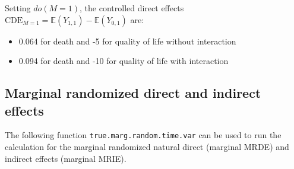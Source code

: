 \documentclass[
]{book}
\providecommand{\tightlist}{%
  \setlength{\itemsep}{0pt}\setlength{\parskip}{0pt}}
\begin{document}
Setting \(do(M=1)\), the controlled direct effects \(\text{CDE}_{M=1} = \mathbb{E}\left(Y_{1,1} \right) - \mathbb{E}\left(Y_{0,1} \right)\) are:

\begin{itemize}
\tightlist
\item
  0.064 for death and -5 for quality of life without interaction
\item
  0.094 for death and -10 for quality of life with interaction
\end{itemize}

\subsection{Marginal randomized direct and indirect effects}\label{marginal-randomized-direct-and-indirect-effects-1}

The following function \texttt{true.marg.random.time.var} can be used to run the calculation for the marginal randomized natural direct (marginal MRDE) and indirect effects (marginal MRIE).
\end{document}
